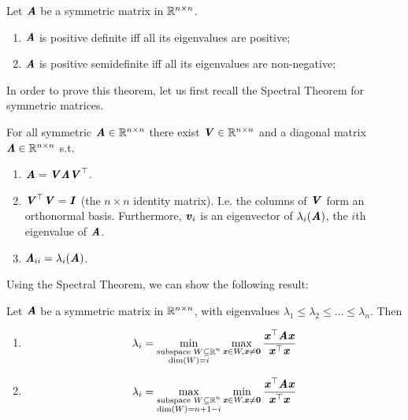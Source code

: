 \begin{theorem}
\label{thm:psdfromeigs}
    Let $\AA$ be a symmetric matrix in $\R^{n\times n}$.
    \begin{enumerate}
        \item $\AA$ is positive definite iff all its eigenvalues are positive;
        \item $\AA$ is positive semidefinite iff all its eigenvalues are non-negative;
    \end{enumerate}
\end{theorem}
In order to prove this theorem, let us first recall the Spectral
Theorem for symmetric matrices.
\begin{theorem}
  \label{thm:spectral}


 For all symmetric $\AA \in \R^{n \times n}$ there exist $\VV \in \R^{n
  \times n}$ and a diagonal matrix $\LLambda \in \R^{n \times n}$
s.t.
\begin{enumerate}
\item $\AA = \VV \LLambda\VV^\trp$.
\item $\VV^\trp \VV = \II$ (the $n \times n$ identity matrix). I.e. the columns of
  $\VV$ form an orthonormal basis.
  Furthermore, $\vv_i$ is an eigenvector of
  $\lambda_i(\AA)$, the $i$th eigenvalue of $\AA$.
\item $\LLambda_{ii} = \lambda_i(\AA)$.
\end{enumerate}
\end{theorem}
Using the Spectral Theorem, we can show the following result:
\begin{theorem}
  \label{thm:courant-fischer}
  Let $\AA$ be a symmetric matrix in $\R^{n\times n}$, with
  eigenvalues $\lambda_1\leq \lambda_2 \leq \ldots \leq \lambda_n$.
  Then
  \begin{enumerate}
  \item
  \label{thm:courant-fischer:minmax}
    \[
    \lambda_i = \min_{
      \substack{
        \text{subspace } W \subseteq \R^n
        \\
        \dim{W} = i
      }
    }
    \max_{
      \xx \in W, \xx \neq \veczero
    }
    \frac{\xx^\trp \AA\xx}{\xx^\trp\xx}
  \]
\item
  \label{thm:courant-fischer:maxmin}
    \[
    \lambda_i
    =
    \max_{
      \substack{
        \text{subspace } W \subseteq \R^n
        \\
        \dim{W} = n+1-i
      }
    }
    \min_{
      \xx \in W, \xx \neq \veczero
    }
    \frac{\xx^\trp \AA\xx}{\xx^\trp\xx}
    \]
  \end{enumerate}
  \end{theorem}
